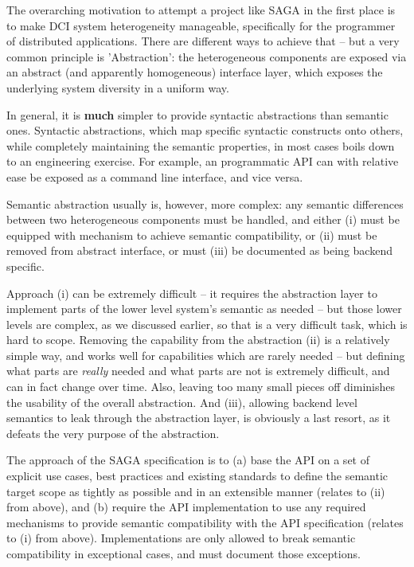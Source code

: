 \documentclass[a4paper,10pt]{article}
\newcommand{\I}[1]{\textit{#1}\xspace}
\newcommand{\B}[1]{\textbf{#1}\xspace}
\begin{document}

    The overarching motivation to attempt a project like SAGA in the
    first place is to make DCI system heterogeneity manageable,
    specifically for the programmer of distributed applications.
    There are different ways to achieve that -- but a very common
    principle is 'Abstraction': the heterogeneous components are
    exposed via an abstract (and apparently homogeneous) interface
    layer, which exposes the underlying system diversity in a uniform
    way.

    In general, it is \B{much} simpler to provide syntactic
    abstractions than semantic ones.  Syntactic abstractions, which
    map specific syntactic constructs onto others, while completely
    maintaining the semantic properties, in most cases boils down to
    an engineering exercise.  For example, an programmatic API can
    with relative ease be exposed as a command line interface, and
    vice versa.

    Semantic abstraction usually is, however, more complex: any
    semantic differences between two heterogeneous components must be
    handled, and either (i) must be equipped with mechanism to achieve
    semantic compatibility, or (ii) must be removed from abstract
    interface, or must (iii) be documented as being backend specific.

    Approach (i) can be extremely difficult -- it requires the
    abstraction layer to implement parts of the lower level system's
    semantic as needed -- but those lower levels are complex, as we
    discussed earlier, so that is a very difficult task, which is hard
    to scope.  Removing the capability from the abstraction (ii) is a
    relatively simple way, and works well for capabilities which are
    rarely needed -- but defining what parts are \I{really} needed and
    what parts are not is extremely difficult, and can in fact change
    over time.  Also, leaving too many small pieces off diminishes the
    usability of the overall abstraction.  And (iii), allowing backend
    level semantics to leak through the abstraction layer, is
    obviously a last resort, as it defeats the very purpose of the
    abstraction.

    The approach of the SAGA specification is to (a) base the API on a
    set of explicit use cases, best practices and existing standards
    to define the semantic target scope as tightly as possible and in
    an extensible manner (relates to (ii) from above), and (b) require
    the API implementation to use any required mechanisms to provide
    semantic compatibility with the API specification (relates to (i)
    from above).  Implementations are only allowed to break semantic
    compatibility in exceptional cases, and must document those
    exceptions.
\end{document}
